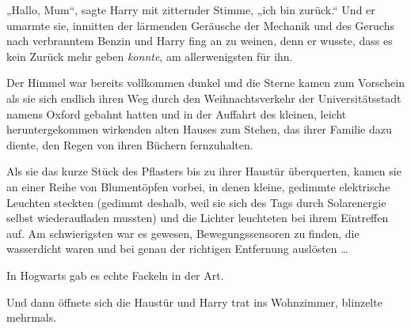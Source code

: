 „Hallo, Mum“, sagte Harry mit zitternder Stimme, „ich bin zurück.“ Und er umarmte sie, inmitten der lärmenden Geräusche der Mechanik und des Geruchs nach verbranntem Benzin und Harry fing an zu weinen, denn er wusste, dass es kein Zurück mehr geben \emph{konnte}, am allerwenigsten für ihn.

\later

Der Himmel war bereits vollkommen dunkel und die Sterne kamen zum Vorschein als sie sich endlich ihren Weg durch den Weihnachtsverkehr der Universitätsstadt namens Oxford gebahnt hatten und in der Auffahrt des kleinen, leicht heruntergekommen wirkenden alten Hauses zum Stehen, das ihrer Familie dazu diente, den Regen von ihren Büchern fernzuhalten.

Als sie das kurze Stück des Pflasters bis zu ihrer Haustür überquerten, kamen sie an einer Reihe von Blumentöpfen vorbei, in denen kleine, gedimmte elektrische Leuchten steckten (gedimmt deshalb, weil sie sich des Tags durch Solarenergie selbst wiederaufladen mussten) und die Lichter leuchteten bei ihrem Eintreffen auf. Am schwierigsten war es gewesen, Bewegungssensoren zu finden, die wasserdicht waren und bei genau der richtigen Entfernung auslösten …

In Hogwarts gab es echte Fackeln in der Art.

Und dann öffnete sich die Haustür und Harry trat ins Wohnzimmer, blinzelte mehrmals.

